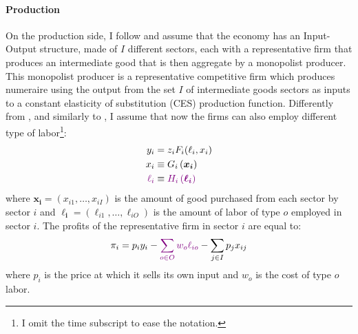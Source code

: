 \documentclass[english,letter,11pt,twoside]{article}
\begin{document}
\paragraph*{Production}
On the production side, I follow \cite{bigio2020distortions} and assume that the economy has an Input-Output structure, made of $I$ different sectors, each with a representative firm that produces an intermediate good that is then aggregate by a monopolist producer. This monopolist producer is a representative competitive firm which produces numeraire using the output from the set $I$ of intermediate goods sectors as inputs to a constant elasticity of substitution (CES) production function. Differently from \cite{bigio2020distortions}, and similarly to \cite{grigsby2022skill}, I assume that now the firms can also employ different type of labor\footnote{I omit the time subscript to ease the notation.}:
\begin{align*}
y_{i} &= z_i F_i (\ell_{i}, x_{i}) \\
x_{i} &\equiv G_i \left( \boldsymbol{x_i} \right) \\
\textcolor{violet}{\ell_{i}} &\equiv \textcolor{violet}{H_i \left( \boldsymbol{\ell_{i}} \right)}
\end{align*}
where $\boldsymbol{x_i} = \left( x_{i1},\ldots,x_{iI} \right)$ is the amount of good purchased from each sector by sector $i$ and $\boldsymbol{\ell_{i}} = \left( \ell_{i1},\ldots, \ell_{iO} \right)$ is the amount of labor of type $o$ employed in sector $i$. The profits of the representative firm in sector $i$ are equal to:
\begin{align*}
\pi_{i} = p_{i} y_{i} - \textcolor{violet}{\sum_{o \in O} w_{o} \ell_{io}} - \sum_{j \in I} p_j x_{ij}
\end{align*}
where $p_{i}$ is the price at which it sells its own input and $w_o$ is the cost of type $o$ labor.
\end{document}
